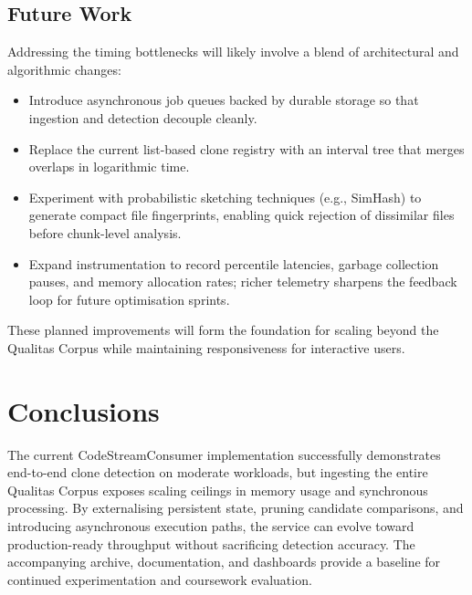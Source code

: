 \documentclass[11pt]{article}
\begin{document}
\subsection*{Future Work}
Addressing the timing bottlenecks will likely involve a blend of architectural and algorithmic changes:
\begin{itemize}
  \item Introduce asynchronous job queues backed by durable storage so that ingestion and detection decouple cleanly.
  \item Replace the current list-based clone registry with an interval tree that merges overlaps in logarithmic time.
  \item Experiment with probabilistic sketching techniques (e.g., SimHash) to generate compact file fingerprints, enabling quick rejection of dissimilar files before chunk-level analysis.
  \item Expand instrumentation to record percentile latencies, garbage collection pauses, and memory allocation rates; richer telemetry sharpens the feedback loop for future optimisation sprints.
\end{itemize}
These planned improvements will form the foundation for scaling beyond the Qualitas Corpus while maintaining responsiveness for interactive users.

\section*{Conclusions}
The current CodeStreamConsumer implementation successfully demonstrates end-to-end clone detection on moderate workloads, but ingesting the entire Qualitas Corpus exposes scaling ceilings in memory usage and synchronous processing.
By externalising persistent state, pruning candidate comparisons, and introducing asynchronous execution paths, the service can evolve toward production-ready throughput without sacrificing detection accuracy.
The accompanying archive, documentation, and dashboards provide a baseline for continued experimentation and coursework evaluation.
\end{document}
